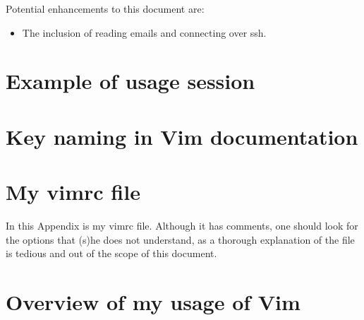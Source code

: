 \documentclass{article}
\begin{document}
Potential enhancements to this document are:
\begin{itemize}
  \item The inclusion of reading emails and connecting over ssh.
\end{itemize}

\appendix
\section{Example of usage session}
\section{Key naming in Vim documentation}
\section{My vimrc file}
In this Appendix is my vimrc file.
Although it has comments, one should
look for the options that (s)he does
not understand, as a thorough explanation
of the file is tedious and out of the scope
of this document.

\section{Overview of my usage of Vim}
\end{document}
